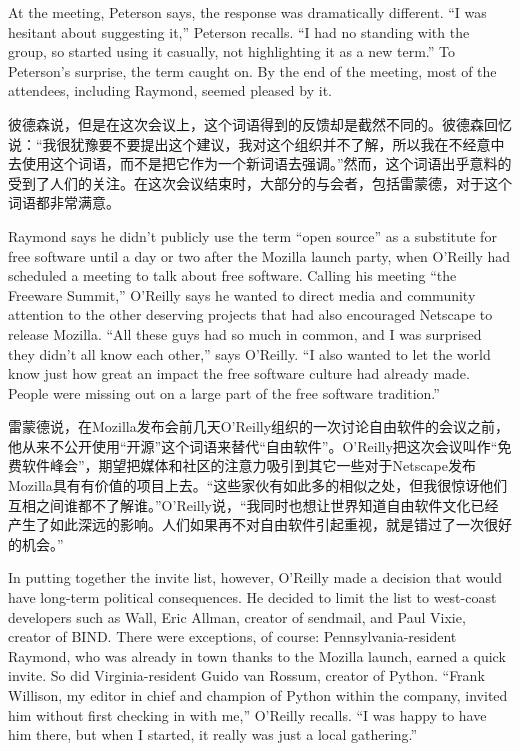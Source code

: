 \ifdefined\eng
At the meeting, Peterson says, the response was dramatically different. ``I was hesitant about suggesting it,'' Peterson recalls. ``I had no standing with the group, so started using it casually, not highlighting it as a new term.'' To Peterson's surprise, the term caught on. By the end of the meeting, most of the attendees, including Raymond, seemed pleased by it.
\fi

\ifdefined\chs
彼德森说，但是在这次会议上，这个词语得到的反馈却是截然不同的。彼德森回忆说：“我很犹豫要不要提出这个建议，我对这个组织并不了解，所以我在不经意中去使用这个词语，而不是把它作为一个新词语去强调。”然而，这个词语出乎意料的受到了人们的关注。在这次会议结束时，大部分的与会者，包括雷蒙德，对于这个词语都非常满意。
\fi

\ifdefined\eng
Raymond says he didn't publicly use the term ``open source'' as a substitute for free software until a day or two after the Mozilla launch party, when O'Reilly had scheduled a meeting to talk about free software. Calling his meeting ``the Freeware Summit,'' O'Reilly says he wanted to direct media and community attention to the other deserving projects that had also encouraged Netscape to release Mozilla. ``All these guys had so much in common, and I was surprised they didn't all know each other,'' says O'Reilly. ``I also wanted to let the world know just how great an impact the free software culture had already made. People were missing out on a large part of the free software tradition.''
\fi

\ifdefined\chs
雷蒙德说，在Mozilla发布会前几天O'Reilly组织的一次讨论自由软件的会议之前，他从来不公开使用“开源”这个词语来替代“自由软件”。O'Reilly把这次会议叫作“免费软件峰会”，期望把媒体和社区的注意力吸引到其它一些对于Netscape发布Mozilla具有有价值的项目上去。“这些家伙有如此多的相似之处，但我很惊讶他们互相之间谁都不了解谁。”O'Reilly说，“我同时也想让世界知道自由软件文化已经产生了如此深远的影响。人们如果再不对自由软件引起重视，就是错过了一次很好的机会。”
\fi

\ifdefined\eng
In putting together the invite list, however, O'Reilly made a decision that would have long-term political consequences. He decided to limit the list to west-coast developers such as Wall, Eric Allman, creator of sendmail, and Paul Vixie, creator of BIND. There were exceptions, of course: Pennsylvania-resident Raymond, who was already in town thanks to the Mozilla launch, earned a quick invite. So did Virginia-resident Guido van Rossum, creator of Python. ``Frank Willison, my editor in chief and champion of Python within the company, invited him without first checking in with me,'' O'Reilly recalls. ``I was happy to have him there, but when I started, it really was just a local gathering.''
\fi

